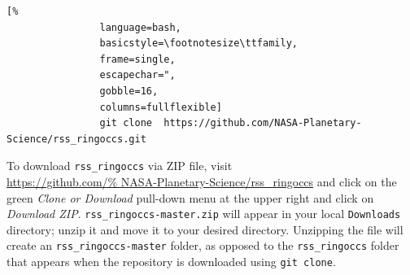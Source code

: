 \documentclass[titlepage, 12pt]{article}
\begin{document}
            \begin{lstlisting}[%
                language=bash,
                basicstyle=\footnotesize\ttfamily,
                frame=single,
                escapechar=",
                gobble=16,
                columns=fullflexible]
                git clone  https://github.com/NASA-Planetary-Science/rss_ringoccs.git
            \end{lstlisting}
            \par
            To download \texttt{rss\_ringoccs} via ZIP file, visit\\ \url{https://github.com/%
                           NASA-Planetary-Science/rss_ringoccs}
                      and click on the green \textit{Clone or Download}
                      pull-down menu at the upper right and click on \textit{Download ZIP}. \texttt{rss\_ringoccs-master.zip} will appear in your local \texttt{Downloads} directory; unzip it and move it to your desired directory. Unzipping the file will create an \texttt{rss\_ringoccs-master} folder, as opposed to the \texttt{rss\_ringoccs} folder that appears when the repository is downloaded using \texttt{git clone}. 
                      \par
  


            
\end{document}

